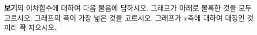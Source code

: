 \textbf{보기}의 이차함수에 대하여 다음 물음에 답하시오.
 그래프가 아래로 볼록한 것을 모두 고르시오.
 그래프의 폭이 가장 넓은 것을 고르시오.
 그래프가 $x$축에 대하여 대칭인 것끼리 짝 지으시오.
